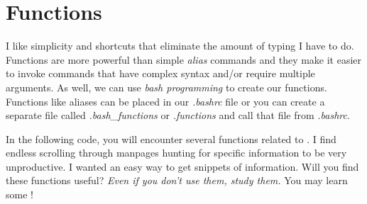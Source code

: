 \section{Functions}\label{sec:functions}

I like simplicity and shortcuts that eliminate the amount of typing I have to do.  Functions are more powerful than simple \emph{alias} commands and they make it easier to invoke commands that have complex syntax and/or require multiple arguments. As well, we can use \emph{bash programming} to create our functions. Functions like aliases can be placed in our \textsl{.bashrc} file or you can create a separate file called \textsl{.bash\_functions} or \textsl{.functions} and call that file from \textsl{.bashrc}.

In the following code, you will encounter several functions related to . I find endless scrolling through manpages hunting for specific information to be very unproductive. I wanted an easy way to get snippets of information. Will you find these functions useful? \textit{Even if you don't use them, study them.} You may learn some !

